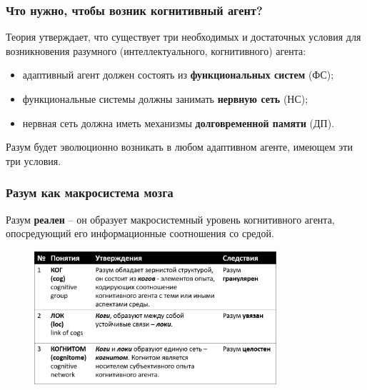 \documentclass[default]{beamer}
\begin{document}
	\begin{frame}
		\frametitle{Что нужно, чтобы возник когнитивный агент?}
		
		Теория утверждает, что существует три необходимых и достаточных условия для возникновения разумного (интеллектуального, когнитивного) агента:
		\begin{itemize}
			\item адаптивный агент должен состоять из \textbf{функциональных систем} (ФС);
			\item функциональные системы должны занимать \textbf{нервную сеть} (НС);
			\item нервная сеть должна иметь механизмы \textbf{долговременной памяти} (ДП).
		\end{itemize}
		\par\bigskip
		Разум будет эволюционно возникать в любом адаптивном агенте, имеющем эти три условия.
	\end{frame}
			
	\begin{frame}
		\frametitle{Разум как макросистема мозга}

		Разум \textbf{реален} – он образует макросистемный уровень когнитивного агента, опосредующий его информационные соотношения со средой. 
				
		\begin{figure}
			\includegraphics[width=0.8\textwidth]{concepts}
		\end{figure}
	\end{frame}	
\end{document}

